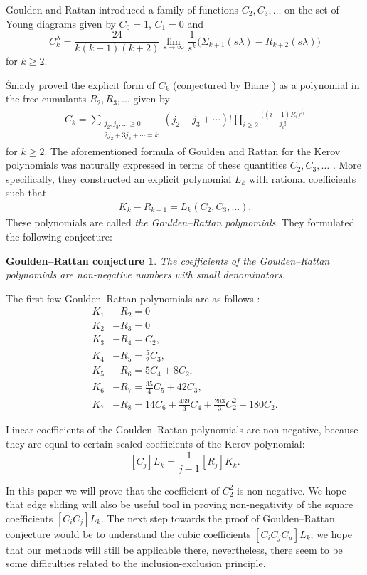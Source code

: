 \documentclass[submission]{FPSAC2021}
\newtheorem*{conjecture}{Goulden--Rattan conjecture}
\begin{document}
Goulden and Rattan \cite{GR05} introduced 
a family of functions $C_2,C_3,\dots$ on 
the set of Young diagrams given by
$C_0=1$, $C_1=0$ and
$$C_k^{\lambda}=\frac{24}{k(k+1)(k+2)}\lim_{s\to\infty}\frac{1}{s^k}\Big(\Sigma_{k+1}(s\lambda)-R_{k+2}(s\lambda)\Big)$$
for $k\geq2$.

Śniady \cite{Sni06} proved the explicit form of $C_k$
(conjectured by Biane \cite{Bia03}) as a polynomial in the 
free cumulants $R_2, R_3, \ldots$ given by
\begin{align}
\label{cformula}
C_k=\sum_{\substack{j_2,j_3,\ldots \geq 0 \\ 2j_2+3j_3+\cdots=k}}
(j_2+j_3+\cdots)!\prod_{i\geq 2} \frac{\big( (i-1)R_i\big)^{j_i}}{j_i!}
\end{align}
for $k\geq 2$.
The aforementioned formula of Goulden and Rattan for 
the Kerov polynomials was naturally expressed in 
terms of these quantities $C_2,C_3,\dots$ \cite{GR05}. 
More specifically, they constructed an explicit 
polynomial $L_k$ with rational coefficients such that 
\begin{align}
\label{grpol}
K_k-R_{k+1}=L_k(C_2, C_3, \ldots).
\end{align}
These polynomials are called 
\emph{the Goulden--Rattan polynomials}. 
They formulated the following conjecture:
\begin{conjecture}
\label{hipotezaGR}
The coefficients of the Goulden--Rattan polynomials 
are non-negative numbers with small denominators. 
\end{conjecture}
The first few Goulden--Rattan polynomials are 
as follows \cite{GR05}:
\begin{align*}
K_1&-R_2=0\\
K_2&-R_3=0\\
K_3&-R_4=C_2,\\
K_4&-R_5=\frac{5}{2}C_3,\\
K_5&-R_6=5C_4+8C_2,\\
K_6&-R_7=\frac{35}{4}C_5+42C_3,\\
K_7&-R_8=14C_6+\frac{469}{3}C_4+\frac{203}{3}C_2^2+180C_2.
\end{align*}

Linear coefficients of the Goulden--Rattan polynomials 
are non-negative, because they are equal to certain 
scaled coefficients of the Kerov polynomial:
\[ [ C_j ] L_k=\frac{1}{j-1} [ R_j ] K_k. \]

In this paper we will prove that the coefficient 
of $C_2^2$ is non-negative. We hope that edge sliding 
will also be useful tool in proving non-negativity of 
the square coefficients $[ C_i C_j ] L_k$.
The next step towards the proof of 
Goulden--Rattan conjecture would be to understand 
the cubic coefficients $ [ C_i C_j C_u ] L_k$; we 
hope that our methods will still be applicable there,
nevertheless, there seem to be some difficulties 
related to the inclusion-exclusion principle.
\end{document}
